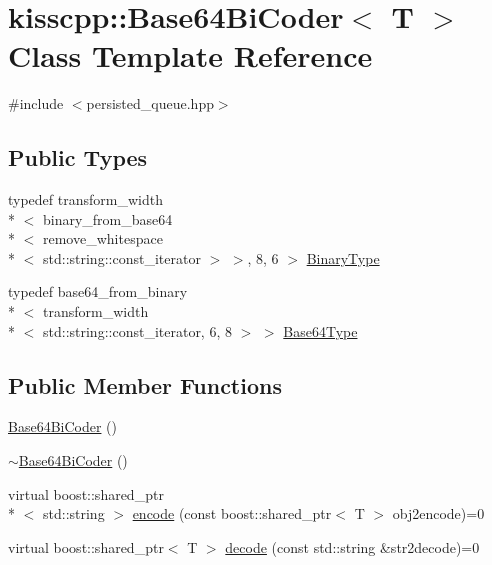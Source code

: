 \hypertarget{classkisscpp_1_1_base64_bi_coder}{\section{kisscpp\-:\-:Base64\-Bi\-Coder$<$ T $>$ Class Template Reference}
\label{classkisscpp_1_1_base64_bi_coder}
}


{\ttfamily \#include $<$persisted\-\_\-queue.\-hpp$>$}

\subsection*{Public Types}
\begin{DoxyCompactItemize}
\item 
typedef transform\-\_\-width\\*
$<$ binary\-\_\-from\-\_\-base64\\*
$<$ remove\-\_\-whitespace\\*
$<$ std\-::string\-::const\-\_\-iterator $>$ $>$, 8, 6 $>$ \hyperlink{classkisscpp_1_1_base64_bi_coder_a3d4011fcafbdf230c7cc8188714ed499}{Binary\-Type}
\item 
typedef base64\-\_\-from\-\_\-binary\\*
$<$ transform\-\_\-width\\*
$<$ std\-::string\-::const\-\_\-iterator, 6, 8 $>$ $>$ \hyperlink{classkisscpp_1_1_base64_bi_coder_a54d2f4ba00e068e8d4d6fd6497ebf21d}{Base64\-Type}
\end{DoxyCompactItemize}
\subsection*{Public Member Functions}
\begin{DoxyCompactItemize}
\item 
\hyperlink{classkisscpp_1_1_base64_bi_coder_a64d95b2904f11acbddf6d70f19e61b35}{Base64\-Bi\-Coder} ()
\item 
\hyperlink{classkisscpp_1_1_base64_bi_coder_a203c4896daf408dfb45c9d57aea0d959}{$\sim$\-Base64\-Bi\-Coder} ()
\item 
virtual boost\-::shared\-\_\-ptr\\*
$<$ std\-::string $>$ \hyperlink{classkisscpp_1_1_base64_bi_coder_ade4ace8899f97568458a62df0222b32c}{encode} (const boost\-::shared\-\_\-ptr$<$ T $>$ obj2encode)=0
\item 
virtual boost\-::shared\-\_\-ptr$<$ T $>$ \hyperlink{classkisscpp_1_1_base64_bi_coder_a8b3f9d0c6d4d88dded790f7627d0a3ea}{decode} (const std\-::string \&str2decode)=0
\end{DoxyCompactItemize}
